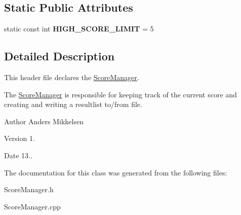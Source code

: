 \subsection*{Static Public Attributes}
\begin{DoxyCompactItemize}
\item 
\hypertarget{class_score_manager_aa99fd79728463ba32eaccb54de34c1ac}{}static const int {\bfseries H\+I\+G\+H\+\_\+\+S\+C\+O\+R\+E\+\_\+\+L\+I\+M\+I\+T} = 5\label{class_score_manager_aa99fd79728463ba32eaccb54de34c1ac}

\end{DoxyCompactItemize}


\subsection{Detailed Description}
This header file declares the \hyperlink{class_score_manager}{Score\+Manager}. 

The \hyperlink{class_score_manager}{Score\+Manager} is responsible for keeping track of the current score and creating and writing a resultlist to/from file.

\begin{DoxyAuthor}{Author}
Anders Mikkelsen 
\end{DoxyAuthor}
\begin{DoxyVersion}{Version}
1. 
\end{DoxyVersion}
\begin{DoxyDate}{Date}
13.. 
\end{DoxyDate}


The documentation for this class was generated from the following files\+:\begin{DoxyCompactItemize}
\item 
Score\+Manager.\+h\item 
Score\+Manager.\+cpp\end{DoxyCompactItemize}

